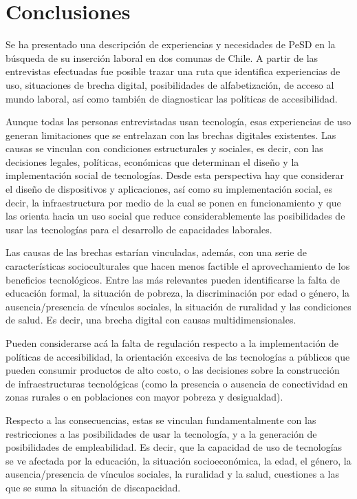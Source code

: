 \section{Conclusiones}\label{sec-conclusiones}

Se ha presentado una descripción de experiencias y necesidades de PeSD
en la búsqueda de su inserción laboral en dos comunas de Chile. A partir
de las entrevistas efectuadas fue posible trazar una ruta que identifica
experiencias de uso, situaciones de brecha digital, posibilidades de
alfabetización, de acceso al mundo laboral, así como también de
diagnosticar las políticas de accesibilidad.

Aunque todas las personas entrevistadas usan tecnología, esas
experiencias de uso generan limitaciones que se entrelazan con las
brechas digitales existentes. Las causas se vinculan con condiciones
estructurales y sociales, es decir, con las decisiones legales,
políticas, económicas que determinan el diseño y la implementación
social de tecnologías. Desde esta perspectiva hay que considerar el
diseño de dispositivos y aplicaciones, así como su implementación
social, es decir, la infraestructura por medio de la cual se ponen en
funcionamiento y que las orienta hacia un uso social que reduce
considerablemente las posibilidades de usar las tecnologías para el
desarrollo de capacidades laborales.

Las causas de las brechas estarían vinculadas, además, con una serie de
características socioculturales que hacen menos factible el
aprovechamiento de los beneficios tecnológicos. Entre las más relevantes
pueden identificarse la falta de educación formal, la situación de
pobreza, la discriminación por edad o género, la ausencia/presencia de
vínculos sociales, la situación de ruralidad y las condiciones de salud.
Es decir, una brecha digital con causas multidimensionales.

Pueden considerarse acá la falta de regulación respecto a la
implementación de políticas de accesibilidad, la orientación excesiva de
las tecnologías a públicos que pueden consumir productos de alto costo,
o las decisiones sobre la construcción de infraestructuras tecnológicas
(como la presencia o ausencia de conectividad en zonas rurales o en
poblaciones con mayor pobreza y desigualdad).

Respecto a las consecuencias, estas se vinculan fundamentalmente con las
restricciones a las posibilidades de usar la tecnología, y a la
generación de posibilidades de empleabilidad. Es decir, que la capacidad
de uso de tecnologías se ve afectada por la educación, la situación
socioeconómica, la edad, el género, la ausencia/presencia de vínculos
sociales, la ruralidad y la salud, cuestiones a las que se suma la
situación de discapacidad.

